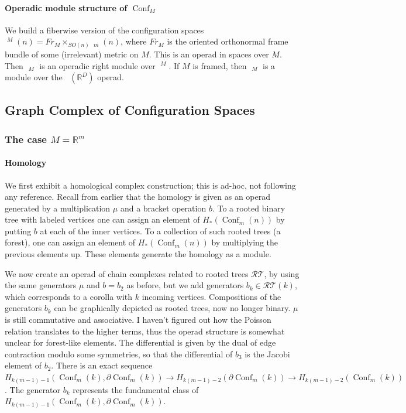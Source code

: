 \documentclass{scrartcl}
\theoremstyle{plain}
\theoremstyle{definition}
\newcommand{\R}{\mathbb R}
\DeclareMathOperator{\Conf}{Conf}
\DeclareMathOperator{\cConf}{\overline{Conf}}
\begin{document}
\paragraph{Operadic module structure of $\Conf_M$} We build a fiberwise version of the configuration spaces $\cConf^M(n) = Fr_M\times_{SO(n)} \cConf_m(n)$, where $Fr_M$ is the oriented orthonormal frame bundle of some (irrelevant) metric on $M$. This is an operad in spaces over $M$. Then $\cConf_M$ is an operadic right module over $\cConf^M$. If $M$ is framed, then $\cConf_M$ is a module over the $\cConf(\R^D)$ operad.






\subsection{Graph Complex of Configuration Spaces}

\subsubsection[The euclidean case]{The case $M=\R^m$}

\paragraph{Homology} We first exhibit a homological complex construction; this is ad-hoc, not following any reference. Recall from earlier that the homology is given as an operad generated by a multiplication $\mu$ and a bracket operation $b$. To a rooted binary tree with labeled vertices one can assign an element of $H_*(\Conf_m(n))$ by putting $b$ at each of the inner vertices. To a collection of such rooted trees (a forest), one can assign an element of $H_*(\Conf_m(n))$ by multiplying the previous elements up. These elements generate the homology as a module. 

We now create an operad of chain complexes related to rooted trees $\mathcal{RT}$, by using the same generators $\mu$ and $b=b_2$ as before, but we add generators $b_k\in\mathcal{RT}(k)$, which corresponds to a corolla with $k$ incoming vertices. Compositions of the generators $b_k$ can be graphically depicted as rooted trees, now no longer binary. $\mu$ is still commutative and associative. I haven't figured out how the Poisson relation translates to the higher terms, thus the operad structure is somewhat unclear for forest-like elements. The differential is given by the dual of edge contraction modulo some symmetries, so that the differential of $b_3$ is the Jacobi element of $b_2$. There is an exact sequence $H_{k(m-1)-1}(\Conf_m(k), \partial\Conf_m(k)) \to H_{k(m-1)-2}(\partial\Conf_m(k)) \to H_{k(m-1)-2}(\Conf_m(k))$. The generator $b_k$ represents the fundamental class of $H_{k(m-1)-1}(\Conf_m(k), \partial\Conf_m(k))$.
\end{document}
